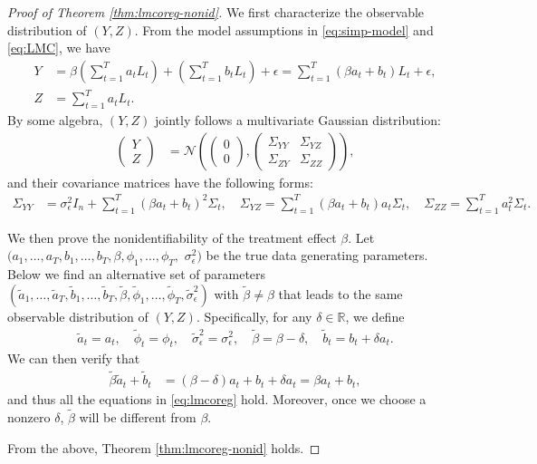 \documentclass[11pt]{article}
\theoremstyle{definition}
\theoremstyle{remark}
\begin{document}
\begin{proof}[Proof of Theorem \ref{thm:lmcoreg-nonid}]
We first characterize the observable distribution of $(Y,Z)$. 
From the model assumptions in  \eqref{eq:simp-model} and \eqref{eq:LMC}, we have  
\begin{align*}
Y &= \beta\left(\sum_{t=1}^T a_t L_t\right) + \left(\sum_{t=1}^T b_t L_t\right)+ \epsilon = \sum_{t=1}^T (\beta a_t + b_t)L_t + \epsilon, \\
Z & = \sum_{t=1}^T a_t L_t. 
\end{align*}
By some algebra,  $(Y,Z)$ jointly follows a multivariate Gaussian distribution:
\begin{align*}
\begin{pmatrix}
Y \\
Z\end{pmatrix} &= \mathcal{N} \left(\begin{pmatrix} 0 \\0\end{pmatrix}, \begin{pmatrix} \Sigma_{YY} & \Sigma_{YZ} \\ \Sigma_{ZY} & \Sigma_{ZZ} \end{pmatrix}\right), 
\end{align*}
and their covariance matrices have the following forms:
\begin{align}\label{eq:lmcoreg}
\Sigma_{YY} &= \sigma_\epsilon^2 I_n + \sum_{t=1}^T (\beta a_t+b_t)^2 \Sigma_t, 
\quad 
 \Sigma_{YZ} = \sum_{t=1}^T (\beta a_t + b_t)a_t \Sigma_t,
\quad 
\Sigma_{ZZ} = \sum_{t=1}^T a_t^2 \Sigma_t.
\end{align}


We then prove the nonidentifiability of the treatment effect $\beta$. 
Let $(a_1,\ldots,a_T, b_1,\ldots,b_T, \beta, \phi_1,\ldots,\phi_T,$ $\sigma_\epsilon^2)$ be the true data generating parameters.
Below we find an alternative set of parameters  $(\tilde{a}_1,\ldots,\tilde{a}_T, \tilde{b}_1,\ldots,\tilde{b}_T, \allowbreak \tilde{\beta}, \allowbreak \tilde{\phi}_1,\ldots,\tilde{\phi}_T, \allowbreak \tilde{\sigma}_\epsilon^2)$ with $\tilde\beta \neq \beta$ 
that leads  to the same observable distribution of $(Y,Z)$. 
Specifically, for any $\delta \in \mathbb{R}$, we define 
\begin{align*}
    \tilde{a}_t = a_t, \quad \tilde{\phi}_t = \phi_t, \quad 
    \tilde\sigma^2_\epsilon = \sigma^2_\epsilon, \quad 
    \tilde\beta = \beta - \delta, \quad 
    \tilde{b}_t = b_t + \delta a_t. 
\end{align*}
We can then verify that 
\begin{align*}
\tilde\beta \tilde a_t + \tilde{b}_t &= (\beta-\delta)a_t + b_t + \delta a_t = \beta a_t + b_t, 
\end{align*} 
and thus all the equations in \eqref{eq:lmcoreg} hold.
Moreover, once we choose a nonzero $\delta$, $\tilde{\beta}$ will be different from $\beta$.

From the above, Theorem \ref{thm:lmcoreg-nonid} holds. 
\end{proof}
\end{document}

